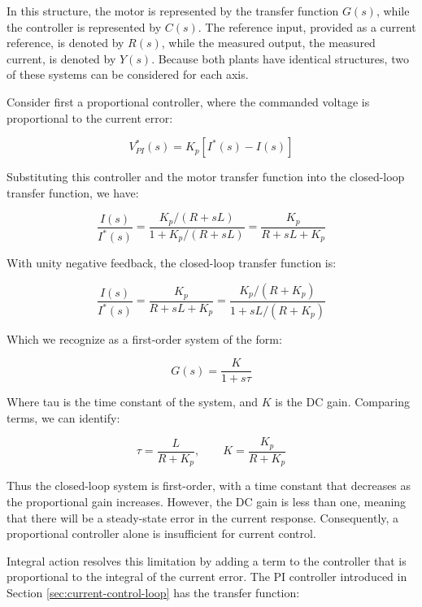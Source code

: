 \documentclass{article}
\begin{document}
In this structure, the motor is represented by the transfer function $G(s)$, while the controller is represented by $C(s)$. The reference input, provided as a current reference, is denoted by $R(s)$, while the measured output, the measured current, is denoted by $Y(s)$. Because both plants have identical structures, two of these systems can be considered for each axis.

Consider first a proportional controller, where the commanded voltage is proportional to the current error:

\begin{equation}
    V_{PI}^*(s)=K_p\left[I^{*}(s)-I(s)\right]
\end{equation}

Substituting this controller and the motor transfer function into the closed-loop transfer function, we have:

\begin{equation}
    \frac{I(s)}{I^*(s)} = \frac{K_p/(R + sL)}{1 + K_p/(R + sL)} = \frac{K_p}{R + sL + K_p}
\end{equation}

With unity negative feedback, the closed-loop transfer function is:

\begin{equation}
    \frac{I(s)}{I^*(s)} = \frac{K_p}{R + sL + K_p} = \frac{K_p/(R + K_p)}{1 + sL/(R + K_p)}
\end{equation}

Which we recognize as a first-order system of the form:

\begin{equation}
    G(s) = \frac{K}{1 + s\tau}
\end{equation}

Where tau is the time constant of the system, and $K$ is the DC gain. Comparing terms, we can identify:

\begin{equation}
    \tau = \frac{L}{R + K_p}, \qquad
    K = \frac{K_p}{R + K_p}
\end{equation}

Thus the closed-loop system is first-order, with a time constant that decreases as the proportional gain increases. However, the DC gain is less than one, meaning that there will be a steady-state error in the current response. Consequently, a proportional controller alone is insufficient for current control.

Integral action resolves this limitation by adding a term to the controller that is proportional to the integral of the current error. The PI controller introduced in 
Section \ref{sec:current-control-loop} has the transfer function:
\end{document}
